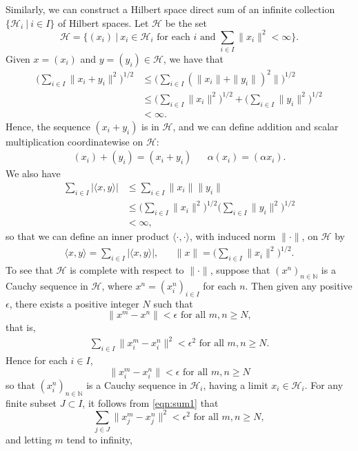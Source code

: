 \documentclass[12pt,a4paper]{report}
\theoremstyle{plain}
\theoremstyle{definition}
\newcommand{\1}{\mathbbm{1}}
\newcommand{\N}{\mathbb{N}}
\renewcommand{\H}{\mathcal{H}}
\begin{document}
Similarly, we can construct a Hilbert space direct sum of an infinite collection 
$\{\H_i ~|~ i\in I\}$ of Hilbert spaces. Let $\H$ be the set
\[
	\H= \{(x_i) ~|~ x_i \in \H_i \mbox{ for each }i 
									\mbox{ and } \sum_{i\in I}{\|x_i\|^2} < \infty \}.
\]
Given $x=(x_i)$ and $y=(y_i)\in\H$, we have that
\begin{align*}
			\Big(\sum_{i\in I}{\|x_i+y_i\|^2}\Big)^{1/2}
	&\leq	\Big(\sum_{i\in I}{(\|x_i\|+\|y_i\|)^2\|}\Big)^{1/2}			\\
	&\leq	\Big(\sum_{i\in I}{\|x_i\|^2}\Big)^{1/2}		+
							\Big(\sum_{i\in I}{\|y_i\|^2}\Big)^{1/2}		\\
	&< \infty.
\end{align*}
Hence, the sequence $(x_i+y_i)$ is in $\H$, and we can define addition and scalar multiplication 
coordinatewise on $\H$:
\begin{align*}
	(x_i)+(y_i)=(x_i+y_i) && \alpha(x_i) = (\alpha x_i).
\end{align*}
We also have
\begin{align*}
			\sum_{i\in I}{|\langle x,y\rangle|} 
	&\leq	\sum_{i\in I}{\|x_i\|\|y_i\|}									\\
	&\leq 	\Big(\sum_{i\in I}{\|x_i\|^2}\Big)^{1/2}
							\Big(\sum_{i\in I}{\|y_i\|^2}\Big)^{1/2}		\\
	&< \infty,
\end{align*}
so that we can define an inner product $\langle\cdot,\cdot\rangle$, with induced norm $\|\cdot\|$, 
on $\H$ by
\begin{align*}
	\langle x,y\rangle = \sum_{i\in I}{|\langle x,y\rangle|}, 
					&& \|x\| = \Big(\sum_{i\in I}{\|x_i\|^2}\Big)^{1/2}.
\end{align*}
To see that $\H$ is complete with respect to $\|\cdot\|$, suppose that $(x^{n})_{n\in\N}$ is a 
Cauchy sequence in $\H$, where $x^{n} = (x^n_i)_{i\in I}$ for each $n$. Then given any positive 
$\epsilon$, there exists a positive integer $N$ such that
\[
	\|x^m-x^n\| < \epsilon \mbox{ for all } m,n\geq N,
\]
that is,
\begin{align}\label{eqn:sum1}
	\sum_{i\in I}{\|x^m_i-x^n_i\|^2} < \epsilon^2 \mbox{ for all } m,n\geq N.
\end{align}
Hence for each $i\in I$,
\[
	\|x^m_i-x^n_i\| < \epsilon \mbox{ for all } m,n\geq N
\]
so that $(x^n_i)_{n\in\N}$ is a Cauchy sequence in $\H_i$, having a limit $x_i\in\H_i$.
For any finite subset $J\subset I$, it follows from \eqref{eqn:sum1} that 
\[
	\sum_{j\in J}{\|x^m_j-x^n_j\|^2} < \epsilon^2  \mbox{ for all } m,n\geq N,
\]
and letting $m$ tend to infinity,
\end{document}
